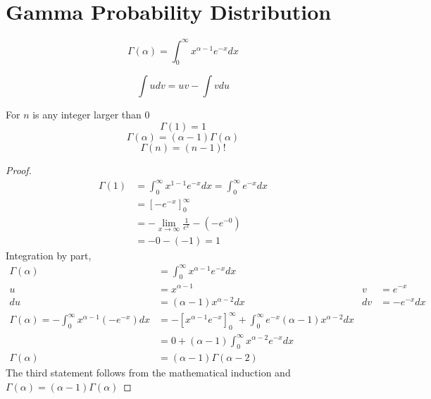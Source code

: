 \section{Gamma Probability Distribution}

\begin{definition}
    \[
    \Gamma(\alpha) = \int^\infty_0 x^{\alpha - 1} e^{-x} dx    
    \]
\end{definition}

\begin{theorem}
    \[
    \int u dv = uv - \int v du    
    \]
\end{theorem}

\begin{theorem} For $n$ is any integer larger than 0
    \[\Gamma(1) = 1 \]
    \[\Gamma(\alpha) = (\alpha -1 )\Gamma(\alpha) \]
    \[\Gamma(n) = (n-1)! \]
\end{theorem}

\begin{proof}
    \begin{align*}
        \Gamma(1) &= \int^\infty_0 x^{1 - 1} e^{-x} dx
            = \int^\infty_0 e^{-x} dx \\
            &= \left[-e^{-x}\right]^\infty_0 \\
            &= -\lim_{x \rightarrow \infty} \frac{1}{e^x}  - (-e^{-0}) \\
            &= - 0 - (- 1) = 1
    \end{align*}
    Integration by part,
    \begin{align*}
        \Gamma(\alpha) 
        &=  \int^\infty_0 x^{\alpha - 1} e^{-x} dx \\
         u  &= x^{\alpha - 1}    & v &= e^{-x} \\
         du &= (\alpha - 1)x^{\alpha - 2} dx & dv &= -e^{-x} dx \\
        \Gamma(\alpha) 
        = - \int^\infty_0  x^{\alpha - 1} (- e^{-x}) dx
        &=  - \left[x^{\alpha - 1} e^{-x} \right]^\infty_0 
            + \int^\infty_0 e^{-x}  (\alpha - 1)x^{\alpha - 2} dx \\
        &= 0 + (\alpha - 1) \int^\infty_0 x^{\alpha - 2}  e^{-x}  dx \\
        \Gamma(\alpha)  &= (\alpha - 1)\Gamma(\alpha - 2)
    \end{align*}
    The third statement follows from the mathematical induction and  $\Gamma(\alpha) = (\alpha -1 )\Gamma(\alpha)$
\end{proof}

